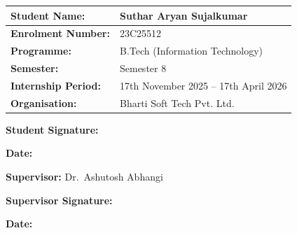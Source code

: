 \documentclass[
  12pt,
  a4paperpaper,
]{report}
\begin{document}
\vspace{4pt}

\noindent\begin{tabularx}{\textwidth}{|p{5.5cm}|X|}
\hline
\textbf{Student Name:}       & Suthar Aryan Sujalkumar \\[2pt]
\hline
\textbf{Enrolment Number:}   & 23C25512 \\[2pt]
\hline
\textbf{Programme:}          & B.Tech (Information Technology) \\[2pt]
\hline
\textbf{Semester:}           & Semester 8 \\[2pt]
\hline
\textbf{Internship Period:}  & 17th November 2025 -- 17th April 2026 \\[2pt]
\hline
\textbf{Organisation:}       & Bharti Soft Tech Pvt. Ltd. \\
\hline
\end{tabularx}

\vspace{1.2cm}

\noindent
\begin{minipage}[t]{0.55\textwidth}
\textbf{Student Signature:} \underline{\hspace{2.2in}}
\end{minipage}\hfill
\begin{minipage}[t]{0.4\textwidth}
\textbf{Date:} \underline{\hspace{1.5in}}
\end{minipage}

\vspace{8pt}

\noindent\textbf{Supervisor:} Dr.~Ashutosh Abhangi

\noindent
\begin{minipage}[t]{0.55\textwidth}
\textbf{Supervisor Signature:} \underline{\hspace{2.0in}}
\end{minipage}\hfill
\begin{minipage}[t]{0.4\textwidth}
\textbf{Date:} \underline{\hspace{1.5in}}
\end{minipage}

\vspace*{\fill}

\vspace*{\fill}
\label{declaration-of-originality}
\vspace{12pt}
\end{document}

